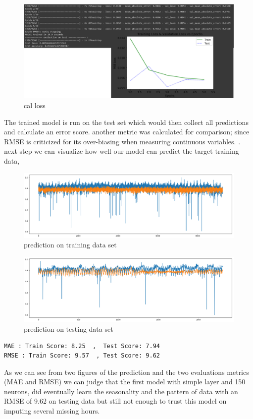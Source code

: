 %
\begin{figure}[h]
\centering
\includegraphics[scale=.4]{img/_verbose.PNG}  
\caption{cal loss}
\label{fig:verbose}
\end{figure}
%
The trained model is run on the test set which would then collect all predictions and calculate an error score. another metric was calculated for comparison; since RMSE is criticized for its over-biasing when measuring continuous variables.
\cite{Chai_Draxler_2014}.\\next step we can visualize how well our model can predict the target training data, 
%
\begin{figure}[h]
\centering
\includegraphics[scale=.4]{img/prevision_sur_training.png}  
\caption{prediction on training data set}
\label{fig:verbose}
\end{figure}
%
%
\begin{figure}[h]
\centering
\includegraphics[scale=.4]{img/prevision_sur_test.png}  
\caption{prediction on testing  data set}
\label{fig:verbose}
\end{figure}
%
\newline
%
\begin{verbatim}
MAE : Train Score: 8.25  ,  Test Score: 7.94
RMSE : Train Score: 9.57  , Test Score: 9.62 
\end{verbatim}
%
As we can see from two figures of the prediction and the two  evaluations metrics (MAE and RMSE) we can judge that the first model with simple layer and 150 neurons, did eventually learn the seasonality and the pattern of data with an RMSE of 9.62 on testing data but still not enough to trust this model on imputing several missing hours. 

